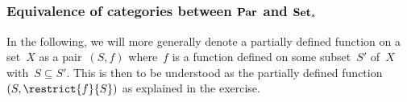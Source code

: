 \subsection{}



\subsubsection*{Equivalence of categories between \texorpdfstring{$\mathbf{Par}$}{Par} and \texorpdfstring{$\mathbf{Set}_*$}{Set\_*}}

In the following, we will more generally denote a partially defined function on a set~$X$ as a pair~$(S, f)$ where~$f$ is a function defined on some subset~$S'$ of~$X$ with~$S ⊆ S'$.
This is then to be understood as the partially defined function~$(S, \restrict{f}{S})$ as explained in the exercise.

